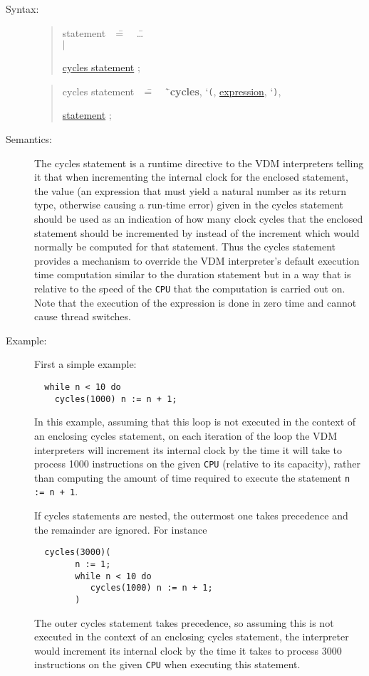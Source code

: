 \documentclass{overturerepchap}
\newcommand{\Lit}[1]{`{\tt #1}\Quote}
\newcommand{\Rule}[2]{
  \begin{quote}\begin{tabbing}
    #1\index{#1}\ \ \= = \ \ \= #2  ; %

  \end{tabbing}\end{quote}
  }
\newcommand{\Ruleref}[1]{
  \hyperlink{rule:#1}{#1}}
\newcommand{\dsep}{\\ \> $|$ \>}
\newcommand{\Lop}[1]{`{\bf\ttfamily #1}\Quote}
\begin{document}
{\begin{description}
\item[Syntax:]
  \Rule{statement}{
    \ldots \dsep
    \Ruleref{cycles statement}
  }
  \Rule{cycles statement}{
    \Lop{cycles}, \Lit{(}, \Ruleref{expression}, \Lit{)},
    \Ruleref{statement}
  }

\item[Semantics:]
The cycles statement is a runtime directive to the VDM interpreters
telling it that when incrementing the internal clock for the enclosed
statement, the value (an expression that must yield a natural number as its return type, otherwise causing a run-time error)
given in the cycles statement should be used as
an indication of how many clock cycles that the enclosed statement
should be incremented by instead of the increment which would normally
be computed for that statement. Thus the cycles statement provides a
mechanism to override the VDM interpreter's default execution time
computation similar to the duration statement but in a way that is
relative to the speed of the \texttt{CPU} that the computation is carried
out on. Note that the execution
of the expression is done in zero time and cannot cause thread switches.

\item[Example:] First a simple example:
\begin{lstlisting}
  while n < 10 do
    cycles(1000) n := n + 1;
\end{lstlisting}
In this example, assuming that this loop is not executed in the
context of an enclosing cycles statement, on each iteration of the
loop the VDM interpreters will increment its internal clock by the time it will
take to process 1000 instructions on the given \texttt{CPU} (relative
to its capacity), rather than computing the amount of time required to
execute the statement \texttt{n := n + 1}.

If cycles statements are nested, the outermost one takes precedence
and the remainder are ignored. For instance
\begin{lstlisting}
  cycles(3000)(
        n := 1;
        while n < 10 do
           cycles(1000) n := n + 1;
        )
\end{lstlisting}
The outer cycles statement takes precedence, so assuming this is not
executed in the context of an enclosing cycles statement, the
interpreter would increment its internal clock by the time it takes to
process 3000 instructions on the given \texttt{CPU} when
executing this statement.


\end{description}}
\end{document}
